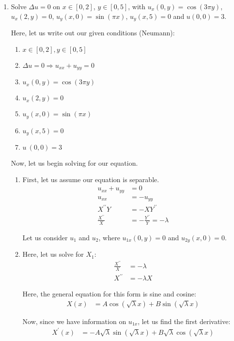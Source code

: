 \documentclass{article}
\begin{document}
\begin{enumerate}
  \item Solve $\Delta u = 0$ on $x \in [0, 2]$, $y \in [0, 5]$, with $u_x(0, y) = \cos(3 \pi y)$, $u_x(2, y) = 0$, $u_y(x, 0) = \sin(\pi x)$, $u_y(x, 5) = 0$ and $u(0, 0) = 3$.

  Here, let us write out our given conditions (Neumann):
  \begin{enumerate}
    \item $x \in [0, 2], y \in [0, 5]$
    \item $\Delta u = 0 \Rightarrow u_{xx} + u_{yy} = 0$
    \item $u_x(0, y) = \cos(3 \pi y)$
    \item $u_x(2, y) = 0$
    \item $u_y(x, 0) = \sin(\pi x)$
    \item $u_y(x, 5) = 0$
    \item $u\ (0, 0) = 3$
  \end{enumerate}

  Now, let us begin solving for our equation.
  \begin{enumerate}
    \item First, let us assume our equation is separable.
    \begin{align}
      u_{xx} + u_{yy} & = 0\\
      u_{xx} & = -u_{yy}\\
      X^{\prime\prime}Y & = -XY^{\prime\prime}\\
      \frac{X^{\prime\prime}}{X} & = -\frac{Y^{\prime\prime}}{Y} = -\lambda
    \end{align}

    Let us consider $u_1$ and $u_2$, where $u_{1x}(0, y) = 0$ and $u_{2y}(x, 0) = 0$.
    \item Here, let us solve for $X_1$:
    \begin{align}
      \frac{X^{\prime\prime}}{X} & = -\lambda\\
      X^{\prime\prime} & = -\lambda X
    \end{align}

    Here, the general equation for this form is sine and cosine:
    \begin{align}
      X(x) & = A \cos(\sqrt \lambda x) + B \sin(\sqrt \lambda x)
    \end{align}

    Now, since we have information on $u_{1x}$, let us find the first derivative:
    \begin{align}
      X^\prime(x) & = -A \sqrt \lambda \sin(\sqrt \lambda x) + B \sqrt \lambda \cos(\sqrt \lambda x)
    \end{align}


\end{enumerate}
\end{enumerate}
\end{document}
